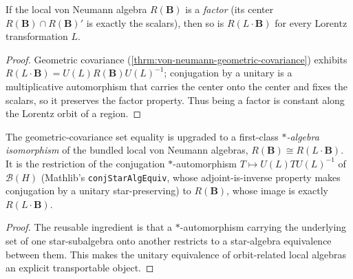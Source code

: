 \begin{theorem}
    \label{thrm:von-neumann-factor-orbit}
    \leanok
    If the local von Neumann algebra $R(\mathbf{B})$ is a \emph{factor} (its center $R(\mathbf{B}) \cap R(\mathbf{B})'$ is exactly the scalars), then so is $R(L \cdot \mathbf{B})$ for every Lorentz transformation $L$.
\end{theorem}
\begin{proof}
    \leanok
    Geometric covariance (\ref{thrm:von-neumann-geometric-covariance}) exhibits $R(L \cdot \mathbf{B}) = U(L) R(\mathbf{B}) U(L)^{-1}$; conjugation by a unitary is a multiplicative automorphism that carries the center onto the center and fixes the scalars, so it preserves the factor property. Thus being a factor is constant along the Lorentz orbit of a region.
\end{proof}

\begin{theorem}
    \label{thrm:von-neumann-covariance-iso}
    \leanok
    The geometric-covariance set equality is upgraded to a first-class \emph{$*$-algebra isomorphism} of the bundled local von Neumann algebras, $R(\mathbf{B}) \cong R(L \cdot \mathbf{B})$. It is the restriction of the conjugation $*$-automorphism $T \mapsto U(L) T U(L)^{-1}$ of $\mathcal{B}(H)$ (Mathlib's \texttt{conjStarAlgEquiv}, whose adjoint-is-inverse property makes conjugation by a unitary star-preserving) to $R(\mathbf{B})$, whose image is exactly $R(L \cdot \mathbf{B})$.
\end{theorem}
\begin{proof}
    \leanok
    The reusable ingredient is that a $*$-automorphism carrying the underlying set of one star-subalgebra onto another restricts to a star-algebra equivalence between them. This makes the unitary equivalence of orbit-related local algebras an explicit transportable object.
\end{proof}

